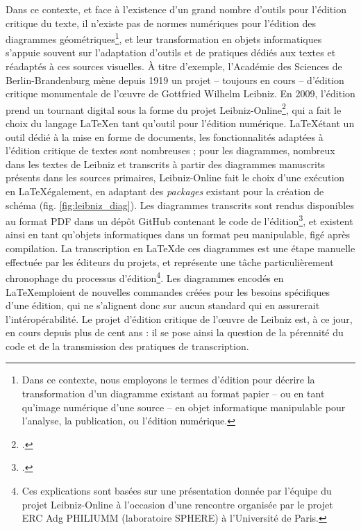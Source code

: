 		Dans ce contexte, et face à l'existence d'un grand nombre d'outils pour l'édition critique du texte, il n'existe pas de normes numériques pour l'édition des diagrammes géométriques\footnote{Dans ce contexte, nous employons le termes d'\og édition \fg pour décrire la transformation d'un diagramme existant au format papier -- ou en tant qu'image numérique d'une source -- en objet informatique manipulable pour l'analyse, la publication, ou l'édition numérique.}, et leur transformation en objets informatiques s'appuie souvent sur l'adaptation d'outils et de pratiques dédiés aux textes et réadaptés à ces sources visuelles. À titre d'exemple, l'Académie des Sciences de Berlin-Brandenburg mène depuis 1919 un projet -- toujours en cours -- d'édition critique monumentale de l'œuvre de Gottfried Wilhelm Leibniz. En 2009, l'édition prend un tournant digital sous la forme du projet Leibniz-Online\footcite{LeibnizOnlineLeibnizEditionc}, qui a fait le choix du langage \LaTeX en tant qu'outil pour l'édition numérique. \LaTeX étant un outil dédié à la mise en forme de documents, les fonctionnalités adaptées à l'édition critique de textes sont nombreuses ; pour les diagrammes, nombreux dans les textes de Leibniz et transcrits à partir des diagrammes manuscrits présents dans les sources primaires, Leibniz-Online fait le choix d'une exécution en \LaTeX également, en adaptant des \textit{packages} existant pour la création de schéma (fig. \ref{fig:leibniz_diag}). Les diagrammes transcrits sont rendus disponibles au format PDF dans un dépôt GitHub contenant le code de l'édition\footcite{TelotaLeibnizVIIILaTeX_TEIa}, et existent ainsi en tant qu'objets informatiques dans un format peu manipulable, figé après compilation. La transcription en \LaTeX de ces diagrammes est une étape manuelle effectuée par les éditeurs du projets, et représente une tâche particulièrement chronophage du processus d'édition\footnote{Ces explications sont basées sur une présentation donnée par l'équipe du projet Leibniz-Online à l'occasion d'une rencontre organisée par le projet ERC Adg PHILIUMM (laboratoire SPHERE) à l'Université de Paris.}. Les diagrammes encodés en \LaTeX emploient de nouvelles commandes créées pour les besoins spécifiques d'une édition, qui ne s'alignent donc sur aucun standard qui en assurerait l'intéropérabilité. Le projet d'édition critique de l'œuvre de Leibniz est, à ce jour, en cours depuis plus de cent ans : il se pose ainsi la question de la pérennité du code et de la transmission des pratiques de transcription. 
		
